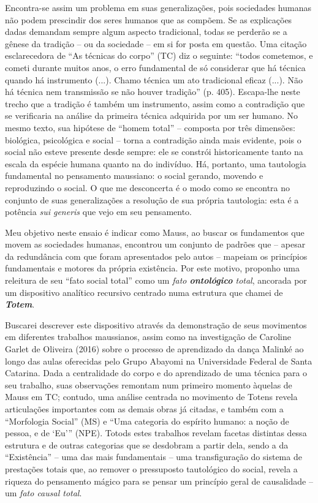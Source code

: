 Encontra-se assim um problema em suas generalizações, pois sociedades humanas não podem prescindir dos seres humanos que as compõem.
Se as explicações dadas demandam sempre algum aspecto tradicional, todas se perderão se a gênese da tradição -- ou da sociedade -- em si for posta em questão.
Uma citação esclarecedora de \enquote{As técnicas do corpo} (TC) diz o seguinte:
\enquote{todos cometemos, e cometi durante muitos anos, o erro fundamental de só considerar que há técnica quando há instrumento (...). Chamo técnica um ato tradicional eficaz (...). Não há técnica nem transmissão se não houver tradição} (p. 405).
Escapa-lhe neste trecho que a tradição é também um instrumento, assim como a contradição que se verificaria na análise da primeira técnica adquirida por um ser humano.
No mesmo texto, sua hipótese de \enquote{homem total} -- composta por três dimensões:
biológica, psicológica e social -- torna a contradição ainda mais evidente, pois o social não esteve presente desde sempre:
ele se constrói historicamente tanto na escala da espécie humana quanto na do indivíduo.
Há, portanto, uma tautologia fundamental no pensamento maussiano:
o social gerando, movendo e reproduzindo o social.
O que me desconcerta é o modo como se encontra no conjunto de suas generalizações a resolução de sua própria tautologia:
esta é a potência \textit{sui generis} que vejo em seu pensamento.

Meu objetivo neste ensaio é indicar como Mauss, ao buscar os fundamentos que movem as sociedades humanas, encontrou um conjunto de padrões que -- apesar da redundância com que foram apresentados pelo autos -- mapeiam os princípios fundamentais e motores da própria existência.
Por este motivo, proponho uma releitura de seu \enquote{fato social total} como um \textit{fato \textbf{ontológico} total}, ancorada por um dispositivo analítico recursivo centrado numa estrutura que chamei de \textit{\textbf{Totem}}.

Buscarei descrever este dispositivo através da demonstração de seus movimentos em diferentes trabalhos maussianos, assim como na investigação de Caroline Garlet de Oliveira (2016) sobre o processo de aprendizado da dança Malinké ao longo das aulas oferecidas pelo Grupo Abayomi na Universidade Federal de Santa Catarina.
Dada a centralidade do corpo e do aprendizado de uma técnica para o seu trabalho, suas observações remontam num primeiro momento àquelas de Mauss em TC;
contudo, uma análise centrada no movimento de Totens revela articulações importantes com as demais obras já citadas, e também com a \enquote{Morfologia Social} (MS) e \enquote{Uma categoria do espírito humano: a noção de pessoa, e de \enquote{Eu}} (NPE).
Totods estes trabalhos revelam facetas distintas dessa estrutura e de outras categorias que se desdobram a partir dela, sendo a da \enquote{Existência} -- uma das mais fundamentais -- uma transfiguração do sistema de prestações totais que, ao remover o pressuposto tautológico do social, revela a riqueza do pensamento mágico para se pensar um princípio geral de causalidade -- um \textit{fato causal total}.

